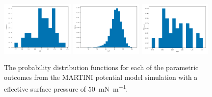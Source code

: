 \documentclass[amsmath,amssymb,superscriptaddress]{revtex4-1}
\begin{document}
%
%
\begin{figure}
 \centering
 \includegraphics[width=0.32\textwidth]{martini_50_dh}
 \includegraphics[width=0.32\textwidth]{martini_50_tt}
 \includegraphics[width=0.32\textwidth]{martini_50_wph}
 \caption{The probability distribution functions for each of the parametric outcomes from the MARTINI potential model simulation with a effective surface pressure of \SI{50}{\milli\newton\per\meter}.}
 \label{fig:ma50}
\end{figure}
%


\end{document}
